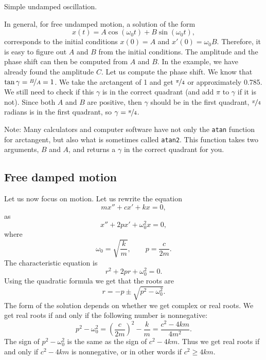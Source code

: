 \begin{mywrapfig}{3.25in}
\capstart
{}
\caption{Simple undamped oscillation.\label{mv:undampedfig}}
\end{mywrapfig}

In general, for free undamped motion, a solution of the
form
\begin{equation*}
x(t) = A \cos (\omega_0 t) + B \sin (\omega_0 t) ,
\end{equation*}
corresponds to the initial conditions $x(0) = A$ and $x'(0) = \omega_0 B$.
Therefore, it is easy to figure out $A$ and $B$ from the initial
conditions. 
The amplitude and the phase shift can then be computed from $A$ and $B$.
In the example, we have already found the amplitude $C$.  Let us
compute the phase shift.  We know that $\tan \gamma = \nicefrac{B}{A} = 1$.  We take the
arctangent of 1 and get $\nicefrac{\pi}{4}$ or approximately 0.785.
We still need to check if this $\gamma$ is in the correct quadrant
(and add $\pi$ to $\gamma$ if it is not).
Since both $A$ and $B$ are positive, then $\gamma$ should be in the first
quadrant, $\nicefrac{\pi}{4}$ radians is in the first quadrant, so $\gamma =
\nicefrac{\pi}{4}$.

Note: Many
calculators and computer software have not only the
\texttt{atan} function
for arctangent, but also what is sometimes called \texttt{atan2}.
This function
takes two arguments, $B$ and $A$, and returns a $\gamma$ in the
correct quadrant for you.

\subsection{Free damped motion}


Let us now focus on  motion.  Let us rewrite the equation
\begin{equation*}
m x'' + c x' + kx = 0,
\end{equation*}
as
\begin{equation*}
x'' + 2p x' + \omega_0^2 x = 0,
\end{equation*}
where
\begin{equation*}
\omega_0 = \sqrt{\frac{k}{m}}, \qquad p = \frac{c}{2m} .
\end{equation*}
The characteristic equation is
\begin{equation*}
r^2 + 2 pr + \omega_0^2 = 0 .
\end{equation*}
Using the quadratic formula we get that the roots are
\begin{equation*}
r = -p \pm \sqrt{p^2 - \omega_0^2} .
\end{equation*}
The form of the solution depends on whether we get complex or real roots.
We get real roots if and only if the following number is nonnegative:
\begin{equation*}
p^2 - \omega_0^2 = {\left( \frac{c}{2m} \right)}^2 - \frac{k}{m}
= \frac{c^2 - 4km}{4m^2} .
\end{equation*}
The sign of $p^2-\omega_0^2$ is the same as the sign of
$c^2 - 4km$.  Thus we get real roots if and only if $c^2-4km$ is
nonnegative, or in other words if $c^2 \geq 4km$.

